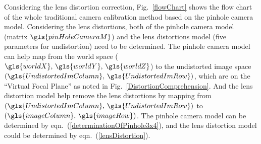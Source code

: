 Considering the lens distortion correction, Fig.~\ref{flowChart} shows the flow chart of the whole traditional camera calibration method based on the pinhole camera model. Considering the lens distortions, both of the pinhole camera model (matrix \(\gls{pinHoleCameraM}\)) and the lens distortions model (five parameters for undistortion) need to be determined. The pinhole camera model can help map from the world space (\(\gls{worldX}, \, \gls{worldY}, \, \gls{worldZ}\)) to the undistorted image space  \((\gls{UndistortedImColumn} , \, \gls{UndistortedImRow})\), which are on the \enquote{Virtual Focal Plane} as noted in Fig.~\ref{DistortionComprehension}. And the lens distortion model help remove the lens distortions by mapping from  \((\gls{UndistortedImColumn} , \, \gls{UndistortedImRow})\) to \((\gls{imageColumn}, \, \gls{imageRow} )\). The pinhole camera model can be determined by eqn.~(\ref{determinationOfPinhole3x4}), and the lens distortion model could be determined by eqn.~(\ref{lensDistortion}).




%
%
%



























